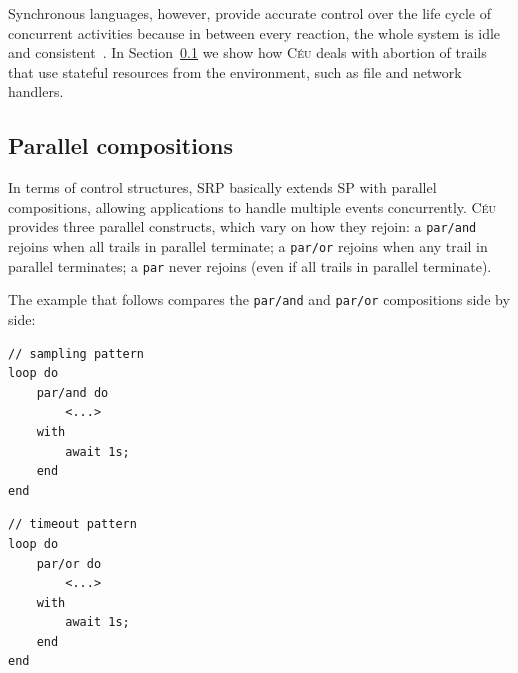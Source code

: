 \documentclass{acm_proc_article-sp}
\newcommand{\CEU}{\textsc{C\'{e}u}\xspace}
\newcommand{\code}[1] {{\small{\texttt{#1}}}}
\newcommand{\1}{\;}
\newcommand{\2}{\;\;}
\newcommand{\3}{\;\;\;}
\newcommand{\5}{\;\;\;\;\;}
\begin{document}
Synchronous languages, however, provide accurate control over the life cycle of 
concurrent activities because in between every reaction, the whole system is 
idle and consistent~\cite{esterel.preemption}.
%
In Section~\ref{sec.ceu.par} we show how \CEU deals with abortion of trails 
that use stateful resources from the environment, such as file and network 
handlers.

%



\subsection{Parallel compositions}
\label{sec.ceu.par}

In terms of control structures, SRP basically extends SP with parallel 
compositions, allowing applications to handle multiple events concurrently.
%
\CEU provides three parallel constructs, which vary on how they rejoin:
a \code{par/and} rejoins when all trails in parallel terminate;
a \code{par/or} rejoins when any trail in parallel terminates;
a \code{par} never rejoins (even if all trails in parallel terminate).

The example that follows compares the \code{par/and} and \code{par/or} 
compositions side by side:

\begin{minipage}[t]{0.40\linewidth}
\begin{lstlisting}
// sampling pattern
loop do
    par/and do
        <...>
    with
        await 1s;
    end
end
\end{lstlisting}
\end{minipage}
%
\begin{minipage}[t]{0.40\linewidth}
\begin{lstlisting}
// timeout pattern
loop do
    par/or do
        <...>
    with
        await 1s;
    end
end
\end{lstlisting}
\end{minipage}
\end{document}
